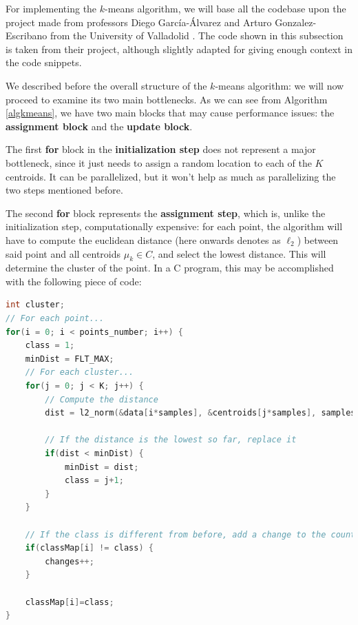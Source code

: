 \documentclass[11pt, journal]{IEEEtran}
\newcommand{\nwl}{

\vspace{11pt}

}
\begin{document}
For implementing the $k$-means algorithm, we will base all the codebase upon the project made from professors Diego García-Álvarez and Arturo Gonzalez-Escribano from the University of Valladolid \cite{kmeans-univallo}. The code shown in this subsection is taken from their project, although slightly adapted for giving enough context in the code snippets.
\nwl
We described before the overall structure of the $k$-means algorithm: we will now proceed to examine its two main bottlenecks. As we can see from Algorithm \ref{algkmeans}, we have two main blocks that may cause performance issues: the \textbf{assignment block} and the \textbf{update block}.
\nwl
The first \textbf{for} block in the \textbf{initialization step} does not represent a major bottleneck, since it just needs to assign a random location to each of the $K$ centroids. It can be parallelized, but it won't help as much as parallelizing the two steps mentioned before.
\nwl
The second \textbf{for} block represents the \textbf{assignment step}, which is, unlike the initialization step, computationally expensive: for each point, the algorithm will have to compute the euclidean distance (here onwards denotes as $\ell_2$) between said point and all centroids $\mu_k \in C$, and select the lowest distance. This will determine the cluster of the point. In a C program, this may be accomplished with the following piece of code:
\nwl
\begin{lstlisting}[language = C]
int cluster;
// For each point...
for(i = 0; i < points_number; i++) {
    class = 1;
    minDist = FLT_MAX;
    // For each cluster...
    for(j = 0; j < K; j++) {
        // Compute the distance
        dist = l2_norm(&data[i*samples], &centroids[j*samples], samples);

        // If the distance is the lowest so far, replace it
        if(dist < minDist) {
            minDist = dist;
            class = j+1;
        }
    }
    
    // If the class is different from before, add a change to the counter
    if(classMap[i] != class) {
        changes++;
    }

    classMap[i]=class;
}\end{lstlisting}
\end{document}
